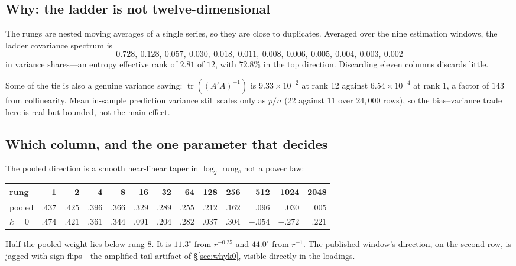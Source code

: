 \documentclass[11pt,a4paper]{article}
\begin{document}
\subsection{Why: the ladder is not twelve-dimensional}

The rungs are nested moving averages of a single series, so they are close to
duplicates. Averaged over the nine estimation windows, the ladder covariance
spectrum is
\[
  0.728,\ 0.128,\ 0.057,\ 0.030,\ 0.018,\ 0.011,\ 0.008,\ 0.006,\ 0.005,\
  0.004,\ 0.003,\ 0.002
\]
in variance shares---an entropy effective rank of $\mathbf{2.81}$ of $12$, with
$72.8\%$ in the top direction. Discarding eleven columns discards little.

Some of the tie is also a genuine variance saving:
$\operatorname{tr}((A'A)^{-1})$ is $9.33\times 10^{-2}$ at rank 12 against
$6.54\times 10^{-4}$ at rank 1, a factor of $143$ from collinearity. Mean
in-sample prediction variance still scales only as $p/n$ ($22$ against $11$ over
$24{,}000$ rows), so the bias--variance trade here is real but bounded, not the
main effect.

\subsection{Which column, and the one parameter that decides}

The pooled direction is a smooth near-linear taper in $\log_2$ rung, not a
power law:

\begin{table}[h]
\centering
\small
\begin{tabular}{lrrrrrrrrrrrr}
\toprule
rung & 1 & 2 & 4 & 8 & 16 & 32 & 64 & 128 & 256 & 512 & 1024 & 2048 \\
\midrule
pooled & $.437$ & $.425$ & $.396$ & $.366$ & $.329$ & $.289$ & $.255$ &
  $.212$ & $.162$ & $.096$ & $.030$ & $.005$ \\
$k{=}0$ & $.474$ & $.421$ & $.361$ & $.344$ & $.091$ & $.204$ & $.282$ &
  $.037$ & $.304$ & $-.054$ & $-.272$ & $.221$ \\
\bottomrule
\end{tabular}
\end{table}

\noindent
Half the pooled weight lies below rung 8. It is $11.3^{\circ}$ from
$r^{-0.25}$ and $44.0^{\circ}$ from $r^{-1}$. The published window's direction,
on the second row, is jagged with sign flips---the amplified-tail artifact of
\S\ref{sec:whyk0}, visible directly in the loadings.
\end{document}

